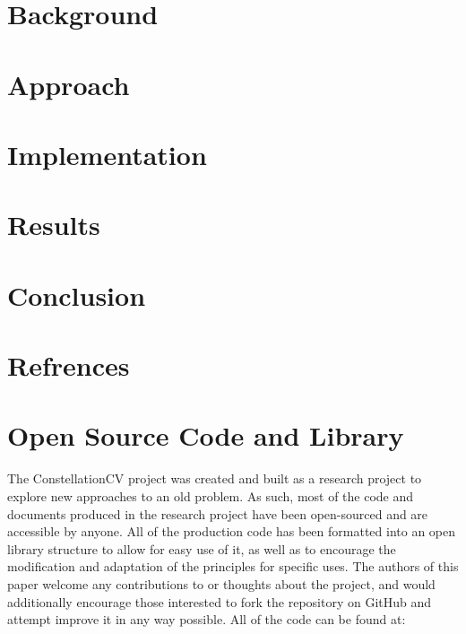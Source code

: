 \documentclass[preprint,12pt]{elsarticle}
\begin{document}
\section{Background}
\label{S:2}




\section{Approach}
\label{S:3}


\section{Implementation}
\label{S:4}


\section{Results}
\label{S:5}


\section{Conclusion}
\label{S:6}



\appendix

\nocite{*}

\section{Refrences}
\label{A:1}



\section{Open Source Code and Library}
\label{A:2}
The ConstellationCV project was created and built as a research project to explore new approaches to an old problem. As such, most of the code
and documents produced in the research project have been open-sourced and are accessible by anyone. All of the production code has been formatted into an open library structure to allow for easy use of it, as well as to encourage the modification and adaptation of the principles for specific uses. The authors of this paper welcome any contributions to or thoughts about the project, and would additionally encourage those interested to fork the repository on GitHub and attempt improve it in any way possible. All of the code can be found at:\\
\end{document}
